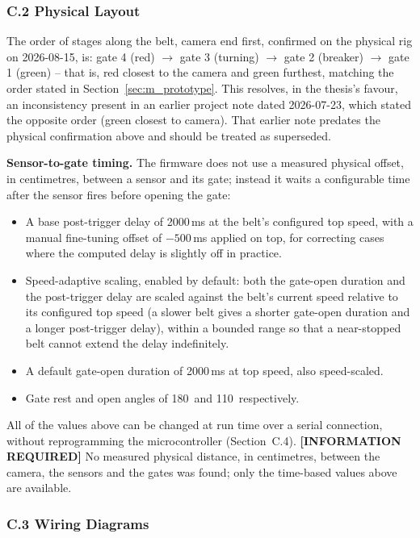 \subsubsection*{C.2 Physical Layout}

The order of stages along the belt, camera end first, confirmed on the physical rig on 2026-08-15, is: gate 4 (red) $\rightarrow$ gate 3 (turning) $\rightarrow$ gate 2 (breaker) $\rightarrow$ gate 1 (green) -- that is, red closest to the camera and green furthest, matching the order stated in Section~\ref{sec:m_prototype}. This resolves, in the thesis's favour, an inconsistency present in an earlier project note dated 2026-07-23, which stated the opposite order (green closest to camera). That earlier note predates the physical confirmation above and should be treated as superseded.

\textbf{Sensor-to-gate timing.} The firmware does not use a measured physical offset, in centimetres, between a sensor and its gate; instead it waits a configurable time after the sensor fires before opening the gate:

\begin{itemize}
    \item A base post-trigger delay of 2000\,ms at the belt's configured top speed, with a manual fine-tuning offset of $-500$\,ms applied on top, for correcting cases where the computed delay is slightly off in practice.
    \item Speed-adaptive scaling, enabled by default: both the gate-open duration and the post-trigger delay are scaled against the belt's current speed relative to its configured top speed (a slower belt gives a shorter gate-open duration and a longer post-trigger delay), within a bounded range so that a near-stopped belt cannot extend the delay indefinitely.
    \item A default gate-open duration of 2000\,ms at top speed, also speed-scaled.
    \item Gate rest and open angles of 180\textdegree\ and 110\textdegree\ respectively.
\end{itemize}

All of the values above can be changed at run time over a serial connection, without reprogramming the microcontroller (Section~C.4). \textbf{[INFORMATION REQUIRED]} No measured physical distance, in centimetres, between the camera, the sensors and the gates was found; only the time-based values above are available.

\subsubsection*{C.3 Wiring Diagrams}

